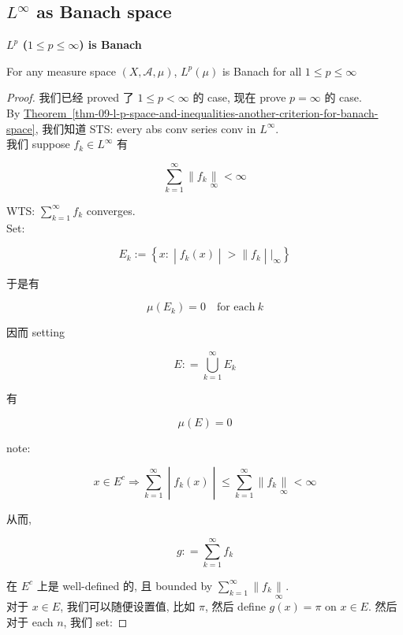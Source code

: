 \documentclass{qlnotes-export}
\begin{document}
\subsection{\texorpdfstring{\(L^{\infty}\) as Banach space}{L\^{}\{\textbackslash infty\} as Banach space}}\label{linfty-as-banach-space}

\begin{theorem}{\protect{}\label{kn-l-p-1-leq-p-leq-infty-is-banach}{\textbf{\(L^{p}\)
(\(1 \leq p \leq \infty\)) is Banach}}}

For any measure space \((X,\mathcal{A},\mu)\), \(L^{p}(\mu)\) is Banach for all \(1 \leq p \leq \infty\)

\end{theorem}

\begin{proof}

我们已经 proved 了 \(1 \leq p < \infty\) 的 case, 现在 prove \(p = \infty\) 的 case.\\
By \hyperref[thm-09-l-p-space-and-inequalities-another-criterion-for-banach-space]{Theorem~\ref*{thm-09-l-p-space-and-inequalities-another-criterion-for-banach-space}}, 我们知道 STS: every abs conv series conv in \(L^{\infty}\).\\
我们 suppose \(f_{k} \in L^{\infty}\) 有

\[\sum\limits_{k = 1}^{\infty} \parallel f_{k}\underset{\infty}{\parallel} < \infty\]

WTS: \(\sum_{k = 1}^{\infty}f_{k}\) converges.\\
Set:

\[E_{k} := \left\{ x: \middle| f_{k}(x) \middle| > \parallel f_{k} \middle| |_{\infty} \right\}\]

于是有

\[\mu(E_{k}) = 0\quad\text{for each}\ k\]

因而 setting

\[E: = \bigcup\limits_{k = 1}^{\infty}E_{k}\]

有

\[\mu(E) = 0\]

note:

\[\left. x \in E^{c}\Longrightarrow\sum\limits_{k = 1}^{\infty} \middle| f_{k}(x) \middle| \leq \sum\limits_{k = 1}^{\infty} \parallel f_{k}\underset{\infty}{\parallel} < \infty \right.\]

从而,

\[g: = \sum\limits_{k = 1}^{\infty}f_{k}\]

在 \(E^{c}\) 上是 well-defined 的, 且 bounded by \(\sum_{k = 1}^{\infty} \parallel f_{k}\underset{\infty}{\parallel}\).\\
对于 \(x \in E\), 我们可以随便设置值, 比如 \(\pi\), 然后 define \(g(x) = \pi\) on \(x \in E\). 然后对于 each \(n\), 我们 set:


\end{proof}
\end{document}
